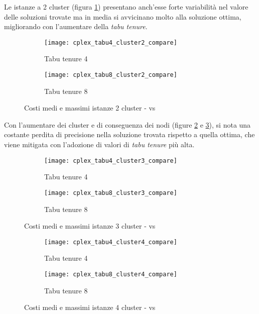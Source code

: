 Le istanze a 2 cluster (figura \ref{fig:costi cplex tabu cluster 2}) presentano anch'esse forte variabilità nel valore delle soluzioni trovate ma in media si avvicinano molto alla soluzione ottima, migliorando con l'aumentare della \emph{tabu tenure}.

\begin{figure}[H]
	\centering
	\begin{subfigure}[b]{.45\textwidth}
			\texttt{[image: cplex\_tabu4\_cluster2\_compare]}
			\caption{Tabu tenure 4}
	\end{subfigure}
	\quad
	\begin{subfigure}[b]{.45\textwidth}
			\texttt{[image: cplex\_tabu8\_cluster2\_compare]}
			\caption{Tabu tenure 8}
	\end{subfigure}
	\caption{Costi medi e massimi istanze 2 cluster -  vs \tabu}
	\label{fig:costi cplex tabu cluster 2}
\end{figure}

Con l'aumentare dei cluster e di conseguenza dei nodi (figure \ref{fig:costi cplex tabu cluster 3} e \ref{fig:costi cplex tabu cluster 4}), si nota una costante perdita di precisione nella soluzione trovata rispetto a quella ottima, che viene mitigata con l'adozione di valori di \emph{tabu tenure} più alta.

\begin{figure}[H]
	\centering
	\begin{subfigure}[b]{.45\textwidth}
			\texttt{[image: cplex\_tabu4\_cluster3\_compare]}
			\caption{Tabu tenure 4}
	\end{subfigure}
	\quad
	\begin{subfigure}[b]{.45\textwidth}
			\texttt{[image: cplex\_tabu8\_cluster3\_compare]}
			\caption{Tabu tenure 8}
	\end{subfigure}
	\caption{Costi medi e massimi istanze 3 cluster -  vs \tabu}
	\label{fig:costi cplex tabu cluster 3}
\end{figure}

\begin{figure}[H]
	\centering
	\begin{subfigure}[b]{.45\textwidth}
			\texttt{[image: cplex\_tabu4\_cluster4\_compare]}
			\caption{Tabu tenure 4}
	\end{subfigure}
	\quad
	\begin{subfigure}[b]{.45\textwidth}
			\texttt{[image: cplex\_tabu8\_cluster4\_compare]}
			\caption{Tabu tenure 8}
	\end{subfigure}
	\caption{Costi medi e massimi istanze 4 cluster -  vs \tabu}
	\label{fig:costi cplex tabu cluster 4}
\end{figure}

